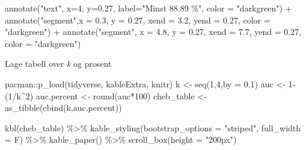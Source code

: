 \documentclass[
]{book}
\newenvironment{Shaded}{\begin{snugshade}}{\end{snugshade}}
\newcommand{\AttributeTok}[1]{\textcolor[rgb]{0.77,0.63,0.00}{#1}}
\newcommand{\DecValTok}[1]{\textcolor[rgb]{0.00,0.00,0.81}{#1}}
\newcommand{\FloatTok}[1]{\textcolor[rgb]{0.00,0.00,0.81}{#1}}
\newcommand{\FunctionTok}[1]{\textcolor[rgb]{0.00,0.00,0.00}{#1}}
\newcommand{\NormalTok}[1]{#1}
\newcommand{\OtherTok}[1]{\textcolor[rgb]{0.56,0.35,0.01}{#1}}
\newcommand{\SpecialCharTok}[1]{\textcolor[rgb]{0.00,0.00,0.00}{#1}}
\newcommand{\StringTok}[1]{\textcolor[rgb]{0.31,0.60,0.02}{#1}}
\begin{document}
\begin{Shaded}
\begin{Highlighting}[]
  \FunctionTok{annotate}\NormalTok{(}\StringTok{"text"}\NormalTok{, }\AttributeTok{x=}\DecValTok{4}\NormalTok{, }\AttributeTok{y=}\FloatTok{0.27}\NormalTok{, }\AttributeTok{label=}\StringTok{"Minst 88.89 \%"}\NormalTok{, }\AttributeTok{color =} \StringTok{"darkgreen"}\NormalTok{) }\SpecialCharTok{+}
  \FunctionTok{annotate}\NormalTok{(}\StringTok{"segment"}\NormalTok{,}\AttributeTok{x =} \FloatTok{0.3}\NormalTok{, }\AttributeTok{y =} \FloatTok{0.27}\NormalTok{, }\AttributeTok{xend =} \FloatTok{3.2}\NormalTok{, }\AttributeTok{yend =} \FloatTok{0.27}\NormalTok{, }\AttributeTok{color =} \StringTok{"darkgreen"}\NormalTok{) }\SpecialCharTok{+}
  \FunctionTok{annotate}\NormalTok{(}\StringTok{"segment"}\NormalTok{, }\AttributeTok{x =} \FloatTok{4.8}\NormalTok{, }\AttributeTok{y =} \FloatTok{0.27}\NormalTok{, }\AttributeTok{xend =} \FloatTok{7.7}\NormalTok{, }\AttributeTok{yend =} \FloatTok{0.27}\NormalTok{, }\AttributeTok{color =} \StringTok{"darkgreen"}\NormalTok{)}
\end{Highlighting}
\end{Shaded}

Lage tabell over \emph{k} og prosent

\begin{Shaded}
\begin{Highlighting}[]
\NormalTok{pacman}\SpecialCharTok{::}\FunctionTok{p\_load}\NormalTok{(tidyverse, kableExtra, knitr)}
\NormalTok{k }\OtherTok{\textless{}{-}} \FunctionTok{seq}\NormalTok{(}\DecValTok{1}\NormalTok{,}\DecValTok{4}\NormalTok{,}\AttributeTok{by =} \FloatTok{0.1}\NormalTok{)}
\NormalTok{auc }\OtherTok{\textless{}{-}} \DecValTok{1}\SpecialCharTok{{-}}\NormalTok{(}\DecValTok{1}\SpecialCharTok{/}\NormalTok{k}\SpecialCharTok{\^{}}\DecValTok{2}\NormalTok{)}
\NormalTok{auc.percent }\OtherTok{\textless{}{-}} \FunctionTok{round}\NormalTok{(auc}\SpecialCharTok{*}\DecValTok{100}\NormalTok{)}
\NormalTok{cheb\_table }\OtherTok{\textless{}{-}} \FunctionTok{as\_tibble}\NormalTok{(}\FunctionTok{cbind}\NormalTok{(k,auc.percent))}

\FunctionTok{kbl}\NormalTok{(cheb\_table) }\SpecialCharTok{\%\textgreater{}\%}
  \FunctionTok{kable\_styling}\NormalTok{(}\AttributeTok{bootstrap\_options =} \StringTok{"striped"}\NormalTok{, }\AttributeTok{full\_width =}\NormalTok{ F) }\SpecialCharTok{\%\textgreater{}\%}
  \FunctionTok{kable\_paper}\NormalTok{() }\SpecialCharTok{\%\textgreater{}\%}
  \FunctionTok{scroll\_box}\NormalTok{(}\AttributeTok{height =} \StringTok{"200px"}\NormalTok{)}
\end{Highlighting}
\end{Shaded}
\end{document}
